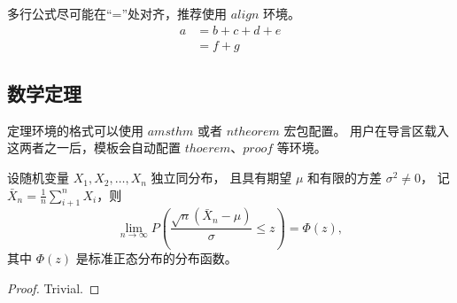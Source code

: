 多行公式尽可能在“=”处对齐，推荐使用 ${align}$ 环境。
\begin{align}
	a & = b + c + d + e \\
	& = f + g
\end{align}



\subsection{数学定理}

定理环境的格式可以使用 ${amsthm}$ 或者 ${ntheorem}$ 宏包配置。
用户在导言区载入这两者之一后，模板会自动配置 ${thoerem}$、${proof}$ 等环境。

\begin{theorem}
	设随机变量 $X_1,X_2, \dots, X_n$ 独立同分布， 且具有期望 $\mu$ 和有限的方差 $\sigma^2 \ne 0$，
	记 $\bar{X}_n = \frac{1}{n} \sum_{i+1}^n X_i$，则
	\begin{equation}
		\lim_{n \to \infty} P \left(\frac{\sqrt{n} \left( \bar{X}_n - \mu \right)}{\sigma} \le z \right) = \Phi(z),
	\end{equation}
	其中 $\Phi(z)$ 是标准正态分布的分布函数。
\end{theorem}
\begin{proof}
	Trivial.
\end{proof}


